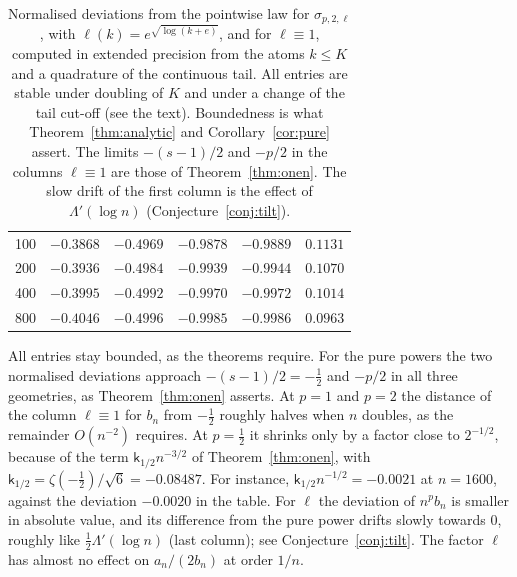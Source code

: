 \begin{table}[ht]
\begin{tabular}{rrrrrr}
 100 & $-0.3868$ & $-0.4969$ & $-0.9878$ & $-0.9889$ & $0.1131$\\
 200 & $-0.3936$ & $-0.4984$ & $-0.9939$ & $-0.9944$ & $0.1070$\\
 400 & $-0.3995$ & $-0.4992$ & $-0.9970$ & $-0.9972$ & $0.1014$\\
 800 & $-0.4046$ & $-0.4996$ & $-0.9985$ & $-0.9986$ & $0.0963$\\
\bottomrule
\end{tabular}
\caption{Normalised deviations from the pointwise law for $\sigma_{p,2,\ell}$, with $\ell(k)=e^{\sqrt{\log(k+e)}}$, and
for $\ell\equiv1$, computed in extended precision from the atoms $k\le K$ and a quadrature of the continuous tail. All
entries are stable under doubling of $K$ and under a change of the tail cut-off (see the text). Boundedness is what
Theorem~\ref{thm:analytic} and Corollary~\ref{cor:pure} assert. The limits $-(s-1)/2$ and $-p/2$ in the columns
$\ell\equiv1$ are those of Theorem~\ref{thm:onen}. The slow drift of the first column is the effect of $\Lambda'(\log n)$ (Conjecture~\ref{conj:tilt}).}
\label{tab:numerics}
\end{table}

All entries stay bounded, as the theorems require. For the pure powers the two normalised deviations approach
$-(s-1)/2=-\frac12$ and $-p/2$ in all three geometries, as Theorem~\ref{thm:onen} asserts. At $p=1$ and $p=2$ the
distance of the column $\ell\equiv1$ for $b_n$ from $-\frac12$ roughly halves when $n$ doubles, as the remainder
$O(n^{-2})$ requires. At $p=\frac12$ it shrinks only by a factor close to $2^{-1/2}$, because of the term
$\mathsf k_{1/2}n^{-3/2}$ of Theorem~\ref{thm:onen}, with $\mathsf k_{1/2}=\zeta(-\frac12)/\sqrt6=-0.08487$. For instance,
$\mathsf k_{1/2}n^{-1/2}=-0.0021$ at $n=1600$, against the deviation $-0.0020$ in the table. For
$\ell$ the deviation of $n^pb_n$ is smaller in absolute value, and its difference from the pure power drifts slowly
towards $0$, roughly like $\frac12\Lambda'(\log n)$ (last column); see Conjecture~\ref{conj:tilt}. The factor $\ell$ has
almost no effect on $a_n/(2b_n)$ at order $1/n$.

